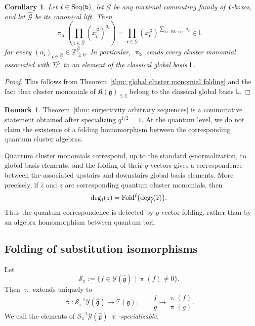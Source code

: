 \documentclass[12pt, leqno]{amsart}
\numberwithin{equation}{section}
\theoremstyle{plain}
\newtheorem{corollary}[lemma]{Corollary}
\theoremstyle{definition}
\newtheorem{remark}[lemma]{Remark}
\newcommand{\seteq}{\mathbin{:=}}
\newcommand{\g}{\mathfrak{g}}
\newcommand{\Fold}{{\rm Fold}}
\newcommand{\ii}{ \textbf{\textit{i}}}
\newcommand{\Fib}{\operatorname{Fib}}
\newcommand{\hg}{{\widehat{\g}}}
\newcommand{\hx}{\widehat{x}}
\newcommand{\hz}{\widehat{z}}
\newcommand{\hii}{{\widehat{\ii}}}
\newcommand{\frakK}{\mathfrak{K}}
\newcommand{\frakc}{\mathfrak{c}}
\newcommand{\hfrakc}{\widehat{\frakc}}
\newcommand{\sfL}{\mathsf{L}}
\newcommand{\bbF}{\mathbb{F}}
\newcommand{\calG}{\mathcal{G}}
\newcommand{\calS}{\mathcal{S}}
\newcommand{\calY}{\mathcal{Y}}
\newcommand{\hcalG}{{\widehat{\calG}}}
\newcommand{\ttb}{\mathtt{b}}
\newcommand{\Seq}{\mathrm{Seq}}
\begin{document}
\begin{corollary}
\label{cor: classical global basis folding}
Let $\ii\in\Seq(\ttb)$, let $\calG$ be any maximal commuting family
of $\ii$-boxes, and let $\hcalG$ be its canonical lift. Then
\[
\uppi_{\ttb}\left(\prod_{\hfrakc\in\hcalG}(\hx_{\hfrakc}^{\hcalG})^{a_{\hfrakc}} \right)
= \prod_{\frakc\in\calG} (x_{\frakc}^{\calG})^{ \sum_{\hfrakc\in\Fib(\frakc)}a_{\hfrakc}} \in \sfL
\]
for every
$(a_{\hfrakc})_{\hfrakc\in\hcalG} \in\mathbb Z_{\geq0}^{\hcalG}$.
In particular, $\uppi_{\ttb}$ sends every cluster monomial associated
with $\Sigma^{\hcalG}$ to an element of the classical global basis
$\sfL$.
\end{corollary}

\begin{proof}
This follows from Theorem~\ref{thm: global cluster monomial folding} and
the fact that cluster monomials of $\frakK(\g)_{\leq\xi}$ belong to the classical global basis $\sfL$.
\end{proof}

\begin{remark}
Theorem~\ref{thm: surjectivity arbitrary sequences} is a commutative statement obtained after
specializing $q^{1/2}=1$.  At the quantum level, we do not claim the
existence of a folding homomorphism between the corresponding
quantum cluster algebras.

  Quantum cluster monomials correspond, up to the
standard $q$-normalization, to global basis elements, and the
folding of their $g$-vectors gives a correspondence between the
associated upstairs and downstairs global basis elements.  More
precisely, if $\hz$ and $z$ are corresponding quantum cluster
monomials, then
\[
\deg_{\ii}(z)
=
\Fold^\ii\bigl(\deg_{\hii}(\hz)\bigr).
\]
Thus the quantum correspondence is detected by $g$-vector folding,
rather than by an algebra homomorphism between quantum tori.
\end{remark}

\subsection{Folding of substitution isomorphisms}
\label{subsec: folding substitution isomorphisms}

Let
\[
\calS_\uppi\seteq \{f\in\calY(\hg)\mid \uppi(f)\ne0\}.
\]
Then $\uppi$ extends uniquely to
\[
\uppi:\calS_\uppi^{-1}\calY(\hg)\longrightarrow\bbF(\g),
\qquad
\frac{f}{g}\longmapsto\frac{\uppi(f)}{\uppi(g)}.
\]
We call the elements of $\calS_\uppi^{-1}\calY(\hg)$
\emph{$\uppi$-specializable}.
\end{document}
